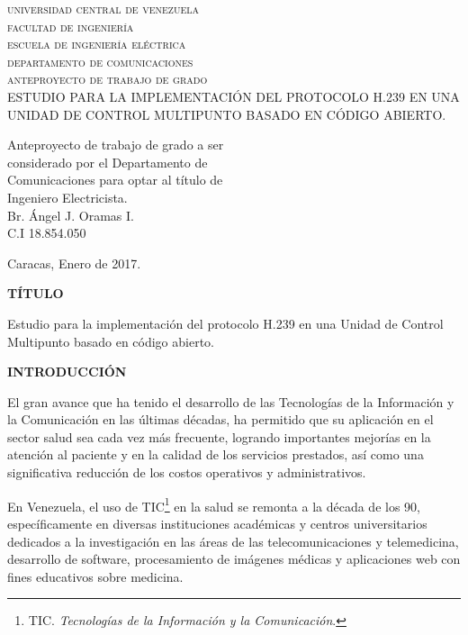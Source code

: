 \documentclass[12pt,letterpaper]{article}
\begin{document}
		

\begin{titlepage}	
\begin{center}
\textsc{universidad central de venezuela\\facultad de ingeniería\\escuela de ingeniería eléctrica\\departamento de comunicaciones\\anteproyecto de trabajo de grado\\}
\vspace*{5cm}
ESTUDIO PARA LA IMPLEMENTACIÓN DEL PROTOCOLO H.239 EN UNA UNIDAD DE CONTROL MULTIPUNTO BASADO EN CÓDIGO ABIERTO.
\end{center}
\vspace*{4cm}

\begin{flushright}
{\footnotesize Anteproyecto de trabajo de grado a ser\\considerado por el Departamento de\\Comunicaciones para optar al título de\\Ingeniero Electricista.}\\
\vspace*{1cm}Br. Ángel J. Oramas I.\\C.I 18.854.050
\end{flushright}

\vfill \centerline {Caracas, Enero de 2017.}	
\end{titlepage}

\newpage
\centerline{\textbf{TÍTULO}}

Estudio para la implementación del protocolo H.239 en una Unidad de Control Multipunto basado en código abierto.

\centerline{\textbf{INTRODUCCIÓN}}

El gran avance que ha tenido el desarrollo de las Tecnologías de la Información y la Comunicación en las últimas décadas, ha permitido que su aplicación en el sector salud sea cada vez más frecuente, logrando importantes mejorías en la atención al paciente y en la calidad de los servicios prestados, así como una significativa reducción de los costos  operativos y administrativos.

En Venezuela, el uso de TIC\footnote{TIC. \emph{Tecnologías de la Información y la Comunicación}.} en la salud se remonta a la década de los 90, específicamente en diversas instituciones académicas y centros universitarios dedicados a la investigación en las áreas de las telecomunicaciones y telemedicina, desarrollo de software, procesamiento de imágenes médicas y aplicaciones web con fines educativos sobre medicina.
\end{document}
